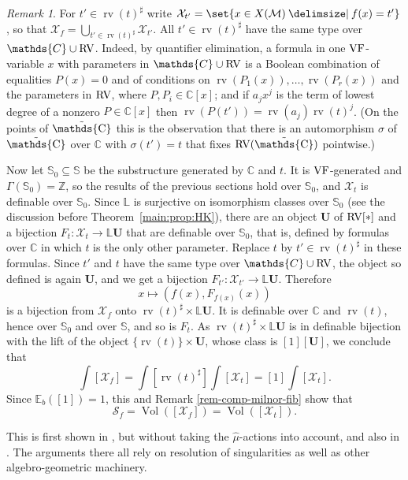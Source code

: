 \documentclass[12pt]{amsart}
\theoremstyle{plain}
\theoremstyle{definition}
\theoremstyle{remark}
\newtheorem{rem}[thm]{Remark}
\numberwithin{equation}{section}
\theoremstyle{plain}
\newcommand{\VF}{\textup{VF}}
\newcommand{\RV}{\textup{RV}}
\newcommand{\MM}{\mdl M}
\newcommand{\Z}{\mathds{Z}}
\newcommand{\C}{\mathds{C}}
\newcommand{\0}{\emptyset}
\newcommand{\mdl}[1]{\mathcal{#1}}  %
\newcommand{\bb}[1]{\mathbb{#1}}
\newcommand{\fun}{\longrightarrow}
\newcommand{\efun}{\longmapsto}
\newcommand{\sub}{\subseteq}
\providecommand\given{}
\newcommand\SetSymbol[1][]{%
\nonscript \: #1 \vert
\allowbreak
\nonscript\:
\mathopen{}}
\renewcommand\given{\SetSymbol[\delimsize]}
\DeclareMathOperator{\rv}{rv}
\DeclareMathOperator{\puC}{\tilde \C}
\DeclareMathOperator{\Vol}{Vol}
\begin{document}
\begin{rem}\label{rem-comp-milnor-fib-bis}
For $t' \in \rv(t)^\sharp$ write $\mdl X_{t'} = \set{x \in X(\MM) \given f(x) = t'}$, so that $\mdl X_f = \bigcup_{t'\in \rv(t)^\sharp} \mdl X_{t'}$. All $t' \in \rv(t)^\sharp$ have the same type over $\C \cup \RV$. Indeed, by quantifier elimination, a formula in one $\VF$-variable $x$ with parameters in $\C \cup \RV$ is a Boolean combination of equalities $P(x) = 0$ and of conditions on $\rv(P_1(x)), \ldots, \rv(P_r(x))$ and the parameters in $\RV$, where $P, P_i \in \C[x]$; and if $a_j x^j$ is the term of lowest degree of a nonzero $P \in \C[x]$ then $\rv(P(t')) = \rv(a_j) \rv(t)^j$. (On the points of $\puC$ this is the observation that there is an automorphism $\sigma$ of $\puC$ over $\C$ with $\sigma(t') = t$ that fixes $\RV(\puC)$ pointwise.)

Now let $\mathbb S_0 \sub \mathbb S$ be the substructure generated by $\C$ and $t$. It is $\VF$-generated and $\Gamma(\mathbb S_0) = \Z$, so the results of the previous sections hold over $\mathbb S_0$, and $\mdl X_t$ is definable over $\mathbb S_0$. Since $\bb L$ is surjective on isomorphism classes over $\mathbb S_0$ (see the discussion before Theorem~\ref{main:prop:HK}), there are an object $\bm U$ of $\RV[*]$ and a bijection $F_t : \mdl X_t \fun \bb L \bm U$ that are definable over $\mathbb S_0$, that is, defined by formulas over $\C$ in which $t$ is the only other parameter. Replace $t$ by $t' \in \rv(t)^\sharp$ in these formulas. Since $t'$ and $t$ have the same type over $\C \cup \RV$, the object so defined is again $\bm U$, and we get a bijection $F_{t'} : \mdl X_{t'} \fun \bb L \bm U$. Therefore
\[
x \efun (f(x), F_{f(x)}(x))
\]
is a bijection from $\mdl X_f$ onto $\rv(t)^\sharp \times \bb L \bm U$. It is definable over $\C$ and $\rv(t)$, hence over $\mathbb S_0$ and over $\mathbb S$, and so is $F_t$. As $\rv(t)^\sharp \times \bb L \bm U$ is in definable bijection with the lift of the object $\{\rv(t)\} \times \bm U$, whose class is $[1] [\bm U]$, we conclude that
\begin{equation*}
\int [\mdl X_f] = \int [\rv(t)^\sharp] \int [\mdl X_t] =  [1]\int [\mdl X_t].
\end{equation*}
Since $\bb E_b([1]) = 1 $, this and Remark \ref{rem-comp-milnor-fib} show that
\[
\mathscr S_f  = \Vol([\mdl X_f]) = \Vol([\mdl X_t]).
\]


This is first shown in \cite{nicaise_ps_tropical}, but without taking the $\hat \mu$-actions into account, and also in \cite{Nic:Pay:trop:fub, forey_virtual_2017}. The arguments there all rely on resolution of singularities as well as other algebro-geometric machinery.
\end{rem}
\end{document}
